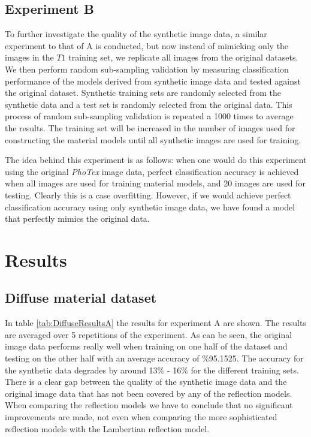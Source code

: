 \subsection{Experiment B}
To further investigate the quality of the synthetic image data, a similar experiment to that of A is conducted, but now instead of mimicking only the images in the $T1$ training set, we replicate all images from the original datasets. We then perform random sub-sampling validation by measuring classification performance of the models derived from synthetic image data and tested against the original dataset. Synthetic training sets are randomly selected from the synthetic data and a test set is randomly selected from the original data. This process of random sub-sampling validation is repeated a 1000 times to average the results. The training set will be increased in the number of images used for constructing the material models until all synthetic images are used for training. 

The idea behind this experiment is as follows: when one would do this experiment using the original {\it PhoTex} image data, perfect classification accuracy is achieved when all images are used for training material models, and 20 images are used for testing. Clearly this is a case overfitting. However, if we would achieve perfect classification accuracy using only synthetic image data, we have found a model that perfectly mimics the original data. 

\section{Results}\label{sec:Results}
\subsection{Diffuse material dataset}
In table \ref{tab:DiffuseResultsA} the results for experiment A are shown. The results are averaged over 5 repetitions of the experiment. As can be seen, the original image data performs really well when training on one half of the dataset and testing on the other half with an average accuracy of \%95.1525. The accuracy for the synthetic data degrades by around 13\% - 16\% for the different training sets. There is a clear gap between the quality of the synthetic image data and the original image data that has not been covered by any of the reflection models. When comparing the reflection models we have to conclude that no significant improvements are made, not even when comparing the more sophisticated reflection models with the Lambertian reflection model. 
 
